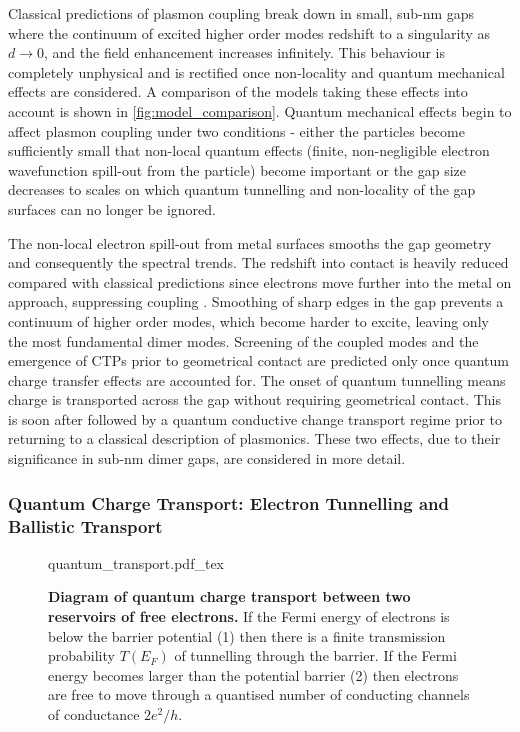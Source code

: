 \documentclass{article}
\begin{document}
Classical predictions of plasmon coupling break down in small, sub-nm gaps where the continuum of excited higher order modes redshift to a singularity as $d\rightarrow0$, and the field enhancement increases infinitely. This behaviour is completely unphysical and is rectified once non-locality and quantum mechanical effects are considered. A comparison of the models taking these effects into account is shown in \autoref{fig:model_comparison}. Quantum mechanical effects begin to affect plasmon coupling under two conditions - either the particles become sufficiently small that non-local quantum effects (finite, non-negligible electron wavefunction spill-out from the particle) become important or the gap size decreases to scales on which quantum tunnelling and non-locality of the gap surfaces can no longer be ignored.

The non-local electron spill-out from metal surfaces smooths the gap geometry and consequently the spectral trends. The redshift into contact is heavily reduced compared with classical predictions since electrons move further into the metal on approach, suppressing coupling \cite{esteban2015}. Smoothing of sharp edges in the gap prevents a continuum of higher order modes, which become harder to excite, leaving only the most fundamental dimer modes.
Screening of the coupled modes and the emergence of CTPs prior to geometrical contact are predicted only once quantum charge transfer effects are accounted for. The onset of quantum tunnelling means charge is transported across the gap without requiring geometrical contact. This is soon after followed by a quantum conductive change transport regime prior to returning to a classical description of plasmonics. These two effects, due to their significance in sub-nm dimer gaps, are considered in more detail.

\FloatBarrier
\subsubsection{Quantum Charge Transport: Electron Tunnelling and Ballistic Transport}

\begin{figure}[bt]
\centering
\fontsize{10pt}{1em}\selectfont
\def\svgwidth{0.65\textwidth}
{quantum_transport.pdf_tex}
\caption[Diagram of quantum charge transport between two reservoirs of free electrons]{\textbf{Diagram of quantum charge transport between two reservoirs of free electrons.} If the Fermi energy of electrons is below the barrier potential (1) then there is a finite transmission probability $T(E_F)$ of tunnelling through the barrier. If the Fermi energy becomes larger than the potential barrier (2) then electrons are free to move through a quantised number of conducting channels of conductance $2e^2/h$.}
\label{fig:quantum_tunnelling}
\vspace{-10pt}
\end{figure}
\end{document}
